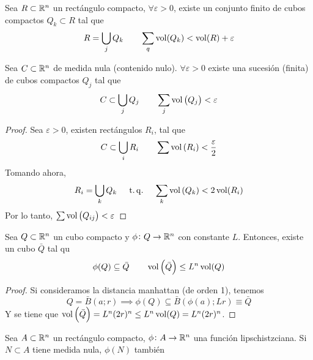 \begin{lema*}
    Sea $R \subset \mathbb{R}^n$ un rectángulo compacto, $\forall \varepsilon > 0$, existe un conjunto finito de cubos compactos $Q_k \subset R$ tal que
    \[
        R = \bigcup_{j} Q_k \qquad
        \sum_{q} \operatorname{vol}(Q_k) < \operatorname{vol}(R) + \varepsilon
    \]
\end{lema*}

\begin{lema*}
    Sea $C \subset \mathbb{R}^n$ de medida nula (contenido nulo). $\forall \varepsilon > 0$ existe una sucesión (finita) de cubos compactos $Q_j$ tal que
    \[
        C \subset \bigcup_{j} Q_j \qquad
        \sum_j \operatorname{vol}\left( Q_j \right) < \varepsilon
    \]
\end{lema*}

\begin{proof}
    Sea $\varepsilon > 0$, existen rectángulos $R_i$, tal que
    \[
        C \subset \bigcup_i R_i \qquad
        \sum \operatorname{vol}\left( R_i \right) < \frac{\varepsilon}{2}
    \]
    Tomando ahora,
    \[
        R_i = \bigcup_k Q_k \quad \operatorname{\;t.q.\;} \quad
        \sum_k \operatorname{vol}\left( Q_k \right) < 2 \operatorname{vol}(R_i)
    \]
    Por lo tanto, $\sum \operatorname{vol}\left(Q_{ij}\right) < \varepsilon$
\end{proof}

\begin{lema*}
    Sea $Q \subset \mathbb{R}^n$ un cubo compacto y $\phi \colon Q \to \mathbb{R}^n$ con constante $L$. Entonces, existe un cubo
    $\bar{Q}$ tal qu
    \[
        \phi(Q) \subseteq \bar{Q} \qquad
        \operatorname{vol}\left( \bar{Q} \right) \leq L^n \operatorname{vol}(Q)
    \]
\end{lema*}

\begin{proof}
    Si consideramos la distancia manhattan (de orden 1), tenemos
    \[
        Q = \bar{B}(a;r) \implies \phi(Q) \subseteq \bar{B} \left( \phi(a); Lr \right) \equiv \bar{Q}
    \]
    Y se tiene que $\operatorname{vol}\left( \bar{Q} \right) = L^n (2r)^n \leq L^n \operatorname{vol}(Q) = L^n (2r)^n$.
\end{proof}

\begin{lema*}
    Sea $A \subset \mathbb{R}^n$ un rectángulo compacto, $\phi \colon A \to \mathbb{R}^n$ una función lipschistzciana. Si $N \subset A$ tiene
    medida nula, $\phi(N)$ tambi\'en 
\end{lema*}

